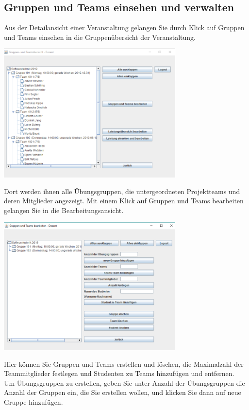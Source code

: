 \documentclass{Handbuch}
\begin{document}
\subsection{Gruppen und Teams einsehen und verwalten}
Aus der Detailansicht einer Veranstaltung gelangen Sie durch Klick auf \frqq Gruppen und Teams einsehen\flqq{} in die Gruppenübersicht der Veranstaltung. 
\begin{center}
	\includegraphics[width=0.7\textwidth]{img_DozentenGUI_11.png}
\end{center}Dort werden ihnen alle Übungsgruppen, die untergeordneten Projektteams und deren Mitglieder angezeigt. Mit einem Klick auf \frqq Gruppen und Teams bearbeiten\flqq{} gelangen Sie in die Bearbeitungsansicht. 
\begin{center}
	\includegraphics[width=0.7\textwidth]{img_DozentenGUI_12.png}
\end{center}
Hier können Sie Gruppen und Teams erstellen und löschen, die Maximalzahl der Teammitglieder festlegen und Studenten zu Teams hinzufügen und entfernen.\\
Um Übungsgruppen zu erstellen, geben Sie unter \glqq Anzahl der Übungsgruppen\grqq{} die Anzahl der Gruppen ein, die Sie erstellen wollen, und klicken Sie dann auf \frqq neue Gruppe hinzufügen\flqq. 
\end{document}
